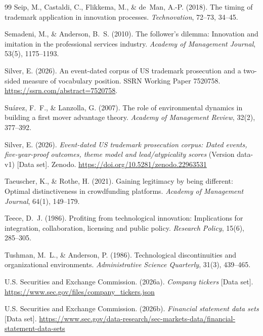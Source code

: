 \begin{thebibliography}{99}
Seip, M., Castaldi, C., Flikkema, M., \& de~Man, A.-P. (2018). The timing
of trademark application in innovation processes. \emph{Technovation},
72--73, 34--45.

Semadeni, M., \& Anderson, B.~S. (2010). The follower's dilemma:
Innovation and imitation in the professional services industry.
\emph{Academy of Management Journal}, 53(5), 1175--1193.

Silver, E. (2026). An event-dated corpus of US trademark prosecution and
a two-sided measure of vocabulary position. SSRN Working Paper 7520758.
\url{https://ssrn.com/abstract=7520758}.

Su\'arez, F.~F., \& Lanzolla, G. (2007). The role of environmental
dynamics in building a first mover advantage theory. \emph{Academy of
Management Review}, 32(2), 377--392.

Silver, E. (2026). \emph{Event-dated US trademark prosecution corpus: Dated
events, five-year-proof outcomes, theme model and lead/atypicality scores}
(Version data-v1)
[Data set]. Zenodo. \url{https://doi.org/10.5281/zenodo.22963531}

Taeuscher, K., \& Rothe, H. (2021). Gaining legitimacy by being different:
Optimal distinctiveness in crowdfunding platforms. \emph{Academy of
Management Journal}, 64(1), 149--179.

Teece, D.~J. (1986). Profiting from technological innovation:
Implications for integration, collaboration, licensing and public
policy. \emph{Research Policy}, 15(6), 285--305.

Tushman, M.~L., \& Anderson, P. (1986). Technological discontinuities and
organizational environments. \emph{Administrative Science Quarterly},
31(3), 439--465.

U.S. Securities and Exchange Commission. (2026a). \emph{Company tickers}
[Data set]. \url{https://www.sec.gov/files/company_tickers.json}

U.S. Securities and Exchange Commission. (2026b). \emph{Financial statement
data sets} [Data set].
\url{https://www.sec.gov/data-research/sec-markets-data/financial-statement-data-sets}


\end{thebibliography}
